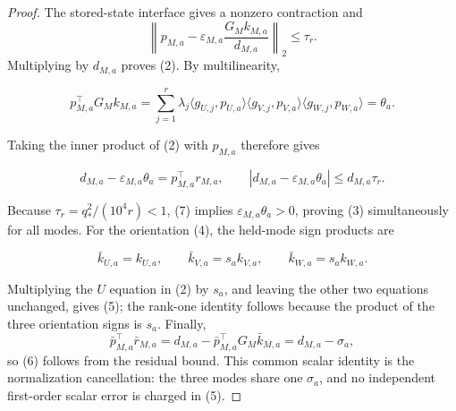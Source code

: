 \begin{lemma}
\begin{proof}
The stored-state interface gives a nonzero
contraction and
\[
\left\|p_{M,a}-\varepsilon_{M,a}
\frac{G_Mk_{M,a}}{d_{M,a}}\right\|_2\le\tau_r.
\]
Multiplying by $d_{M,a}$ proves (2).  By multilinearity,

\[
p_{M,a}^{\top}G_Mk_{M,a}
=\sum_{j=1}^r\lambda_j
\langle g_{U,j},p_{U,a}\rangle
\langle g_{V,j},p_{V,a}\rangle
\langle g_{W,j},p_{W,a}\rangle
=\theta_a.
\]

Taking the inner product of (2) with $p_{M,a}$ therefore gives

\[
d_{M,a}-\varepsilon_{M,a}\theta_a
=p_{M,a}^{\top}r_{M,a},
\qquad
|d_{M,a}-\varepsilon_{M,a}\theta_a|\le d_{M,a}\tau_r.
\tag{7}
\]

Because $\tau_r=q_*^2/(10^4r)<1$, (7) implies
$\varepsilon_{M,a}\theta_a>0$, proving (3) simultaneously for all modes.
For the orientation (4), the held-mode sign products are

\[
\bar k_{U,a}=k_{U,a},\qquad
\bar k_{V,a}=s_ak_{V,a},\qquad
\bar k_{W,a}=s_ak_{W,a}.
\]

Multiplying the $U$ equation in (2) by $s_a$, and leaving the other two
equations unchanged, gives (5); the rank-one identity follows because the
product of the three orientation signs is $s_a$.  Finally,
\[
\bar p_{M,a}^{\top}\bar r_{M,a}
=d_{M,a}-\bar p_{M,a}^{\top}G_M\bar k_{M,a}
=d_{M,a}-\sigma_a,
\]
so (6) follows from the residual bound.  This common scalar identity is the
normalization cancellation: the three modes share one $\sigma_a$, and no
independent first-order scalar error is charged in (5).  


\end{proof}
\end{lemma}
